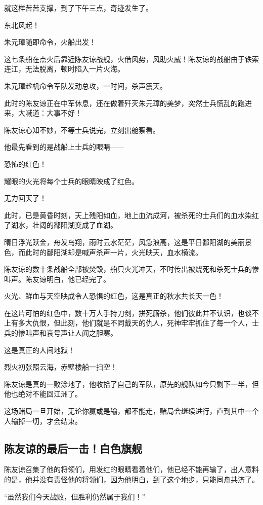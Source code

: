 \begin{multicols}{\theparacolNo}
		就这样苦苦支撑，到了下午三点，奇迹发生了。

		东北风起！

		朱元璋随即命令，火船出发！

		这七条船在点火后靠近陈友谅战舰，火借风势，风助火威！陈友谅的战船由于铁索连江，无法脱离，顿时陷入一片火海。

		朱元璋趁机命令军队发动总攻，一时间，杀声震天。

		此时的陈友谅正在中军休息，还在做着歼灭朱元璋的美梦，突然士兵慌乱的跑进来，大喊道：大事不好！

		陈友谅心知不妙，不等士兵说完，立刻出舱察看。

		他最先看到的是战船上士兵的眼睛——

		恐怖的红色！

		耀眼的火光将每个士兵的眼睛映成了红色。

		无力回天了！

		此时，已是黄昏时刻，天上残阳如血，地上血流成河，被杀死的士兵们的血水染红了湖水，壮阔的鄱阳湖变成了血湖。

		晴日浮光跃金，舟发鸟翔，雨时云水茫茫，风急浪高，这是平日鄱阳湖的美丽景色，而此时的鄱阳湖却是喊声杀声一片，火光映天，血水横流。

		陈友谅的数十条战船全部被焚毁，船只火光冲天，不时传出被烧死和杀死士兵的惨叫声。陈友谅明白，他已经完了。

		火光、鲜血与天空映成令人恐惧的红色，这是真正的秋水共长天一色！

		在这片可怕的红色中，数十万人手持刀剑，拼死厮杀，他们彼此并不认识，也谈不上有多大仇恨，但此刻，他们就是不同戴天的仇人，死神牢牢抓住了每一个人，士兵的惨叫声和哀号声让人闻之胆寒。

		这是真正的人间地狱！

		烈火初张照云海，赤壁楼船一扫空！

		陈友谅是真的一败涂地了，他收拾了自己的军队，原先的舰队如今只剩下一半，但他也绝对不能回江洲了。

		这场赌局一旦开始，无论你赢或是输，都不能走，赌局会继续进行，直到其中一个人输掉一切，才会结束。

		\subsection{陈友谅的最后一击！白色旗舰}
		陈友谅召集了他的将领们，用发红的眼睛看着他们，他已经不能再输了，出人意料的是，他并没有责怪他的将领们，因为他明白，到了这个地步，只能同舟共济了。

		“虽然我们今天战败，但胜利仍然属于我们！”


\end{multicols}
